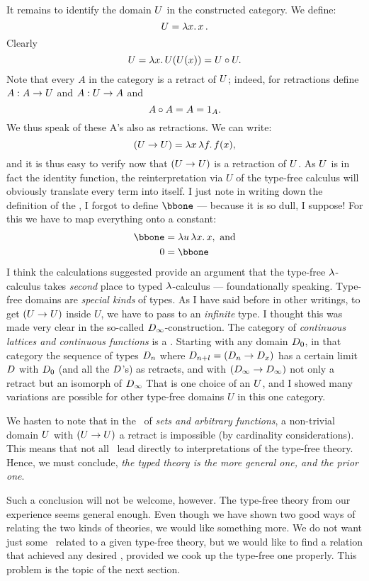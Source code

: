 It remains to identify the domain $U$ in the constructed category. We define:
$$
\U = \lm{x}. x\, .
$$
Clearly
$$
\U = \lm{x}.U(U(x)) = \U \comp \U .
$$
Note that every $A$ in the category is a retract of $U$; indeed, for retractions define $A : A \rightarrow U$ and $A: U\rightarrow A$ and
$$
A \circ A = A = {\mathrm 1}_A.
$$
We thus speak of these A's also as retractions. We can write:
$$
(\U\to \U) = \lmm{x}{f}. f(x),
$$
and it is thus easy to verify now that $(U\rightarrow U)$ is a retraction of $U$. As $U$ is in fact the identity function, the reinterpretation via $U$ of the type-free calculus will obviously translate every term into itself.
I just note in writing down the definition of the \ccc, I
forgot to define $\bbone$ --- because it is so dull, I suppose! For this we have to map everything onto a constant:
\begin{align*}
\bbone &= \lmm{u}{x}.x, {\textrm{ and}} \\
\zeromap &= \bbone
\end{align*}
I think the calculations suggested provide an argument that the type-free $\lambda$-calculus takes {\it second} place to typed $\lambda$-calculus --- foundationally speaking. Type-free domains are \emph{special kinds} of types. As I have said before in other writings, to get $(U \rightarrow U)$ inside $U$, we have to pass to an {\it infinite} type. I thought this was made very clear in the so-called $D_{\infty}$-construction. The category of \emph{continuous lattices and continuous functions} is a \ccc. Starting with any domain $D_0$, in that category the sequence of types $D_n$ where $D_{n+l} =  (D_n \rightarrow D_x)$  has a certain limit $D$ with $D_0$ (and all the $D$'s) as retracts, and with $(D_\infty \rightarrow D_\infty)$ not only a retract but an isomorph of $D_\infty$
That is one choice of an $U$, and I showed many variations are possible for other type-free domains $U$ in this one category.

We hasten to note that in the \ccc\ of {\it sets and arbitrary functions}, a non-trivial domain $U$ with $(U\rightarrow U)$ a retract is impossible (by cardinality considerations). This means that not all \ccc\ lead directly to interpretations of the type-free theory. Hence, we must conclude, {\it the typed theory is the more general one, and the prior one}.

Such a conclusion will not be welcome, however. The type-free theory from our experience seems general enough. Even though we have shown two good ways of relating the two kinds of theories, we would like something more. We do not want just some \ccc\ related to a given type-free theory, but we would like to find a relation that achieved any desired \ccc, provided we cook up the type-free one properly. This problem is the topic of the next section.

